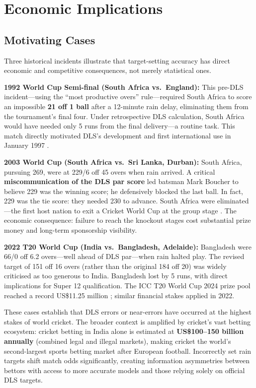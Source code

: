 \documentclass[10pt,a4paper,twocolumn]{article}
\begin{document}
\section{Economic Implications}
\label{sec:economics}

\subsection{Motivating Cases}

Three historical incidents illustrate that target-setting accuracy has direct economic and competitive consequences, not merely statistical ones.

\textbf{1992 World Cup Semi-final (South Africa vs.\ England):} This pre-DLS incident---using the ``most productive overs'' rule---required South Africa to score an impossible \textbf{21 off 1 ball} after a 12-minute rain delay, eliminating them from the tournament's final four. Under retrospective DLS calculation, South Africa would have needed only 5 runs from the final delivery---a routine task. This match directly motivated DLS's development and first international use in January 1997 \citep{cricinfo_sa1992}.

\textbf{2003 World Cup (South Africa vs.\ Sri Lanka, Durban):} South Africa, pursuing 269, were at 229/6 off 45 overs when rain arrived. A critical \textbf{miscommunication of the DLS par score} led batsman Mark Boucher to believe 229 was the winning score; he defensively blocked the last ball. In fact, 229 was the tie score: they needed 230 to advance. South Africa were eliminated---the first host nation to exit a Cricket World Cup at the group stage \citep{wisden2003}. The economic consequence: failure to reach the knockout stages cost substantial prize money and long-term sponsorship visibility.

\textbf{2022 T20 World Cup (India vs.\ Bangladesh, Adelaide):} Bangladesh were 66/0 off 6.2 overs---well ahead of DLS par---when rain halted play. The revised target of 151 off 16 overs (rather than the original 184 off 20) was widely criticised as too generous to India. Bangladesh lost by 5 runs, with direct implications for Super 12 qualification. The ICC T20 World Cup 2024 prize pool reached a record US\$11.25 million \citep{icc_t20_2024prizes}; similar financial stakes applied in 2022.

These cases establish that DLS errors or near-errors have occurred at the highest stakes of world cricket. The broader context is amplified by cricket's vast betting ecosystem: cricket betting in India alone is estimated at \textbf{US\$100--150 billion annually} (combined legal and illegal markets), making cricket the world's second-largest sports betting market after European football. Incorrectly set rain targets shift match odds significantly, creating information asymmetries between bettors with access to more accurate models and those relying solely on official DLS targets.
\end{document}
